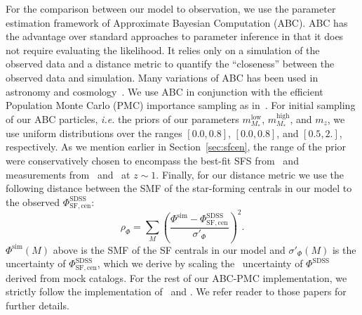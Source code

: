 \documentclass[12pt, letterpaper, preprint, tighten]{aastex62}
\newcommand{\todo}[1]{{\bf \textcolor{red}{#1}}}
\newcommand{\beq}{\begin{equation}}
\newcommand{\eeq}{\end{equation}}
\begin{document}
For the comparison between our model to observation, we use the parameter 
estimation framework of Approximate Bayesian Computation (ABC). ABC has the 
advantage over standard approaches to parameter inference in that it does not 
require evaluating the likelihood. It relies only on a simulation of the observed 
data and a distance metric to quantify the ``closeness'' between the observed data
and simulation. Many variations of ABC has been used in astronomy and 
cosmology~\citep[\emph{e.g.}][]{cameron2012,weyant2013,ishida2015,alsing2018}. 
We use ABC in conjunction with the efficient Population Monte Carlo (PMC)
importance sampling as in~\citep{hahn2017b, hahn2017}. For initial sampling 
of our ABC particles, \emph{i.e.} the priors of our parameters 
$m^\mathrm{low}_{M_*}$, $m^\mathrm{high}_{M_*}$, and $m_z$, we use uniform 
distributions over the ranges $[0.0, 0.8]$, $[0.0, 0.8]$, and 
$[0.5, 2.]$, respectively. As we mention earlier in Section~\ref{sec:sfcen}, 
the range of the prior were conservatively chosen to encompass the best-fit 
SFS from~\cite{speagle2014} 
and measurements from~\cite{moustakas2013} and~\cite{lee2015} at $z \sim 1$. 
Finally, for our distance metric we use the following distance between 
the SMF of the star-forming centrals in our model to the observed 
$\Phi^\mathrm{SDSS}_\mathrm{SF,cen}$: 
\beq
\rho_\Phi = \sum\limits_{M} \left( \frac{\Phi^\mathrm{sim} - \Phi^\mathrm{SDSS}_\mathrm{SF,cen}}{\sigma'_\Phi}\right)^2.
\eeq
$\Phi^\mathrm{sim}(M)$ above is the SMF of the SF centrals in our model 
and $\sigma'_\Phi(M)$ is the uncertainty of $\Phi^\mathrm{SDSS}_\mathrm{SF,cen}$, 
which we derive by scaling the~\cite{li2009} uncertainty of $\Phi^\mathrm{SDSS}$ 
derived from mock catalogs. %
For the rest of our ABC-PMC implementation, we strictly follow the implementation 
of~\cite{hahn2017} and \cite{hahn2017b}. We refer reader to those papers for 
further details.
\end{document}
